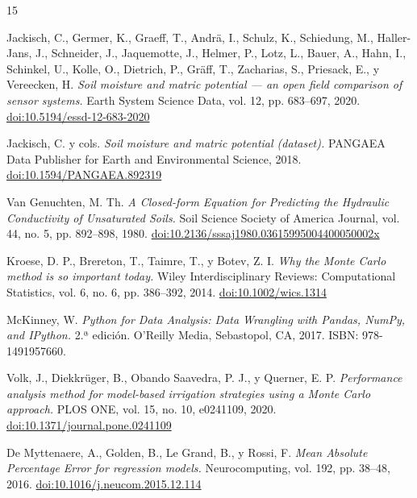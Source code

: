 \documentclass[12pt,a4paper]{article}
\begin{document}
\begin{thebibliography}{15}
\raggedright

Jackisch, C., Germer, K., Graeff, T., Andrä, I., Schulz, K., Schiedung, M., Haller-Jans, J., Schneider, J., Jaquemotte, J., Helmer, P., Lotz, L., Bauer, A., Hahn, I., Schinkel, U., Kolle, O., Dietrich, P., Gräff, T., Zacharias, S., Priesack, E., y Vereecken, H.
\textit{Soil moisture and matric potential --- an open field comparison of sensor systems.}
Earth System Science Data, vol. 12, pp. 683--697, 2020.
\href{https://doi.org/10.5194/essd-12-683-2020}{doi:10.5194/essd-12-683-2020}

Jackisch, C. y cols.
\textit{Soil moisture and matric potential (dataset).}
PANGAEA Data Publisher for Earth and Environmental Science, 2018.
\href{https://doi.org/10.1594/PANGAEA.892319}{doi:10.1594/PANGAEA.892319}

Van Genuchten, M. Th.
\textit{A Closed-form Equation for Predicting the Hydraulic Conductivity of Unsaturated Soils.}
Soil Science Society of America Journal, vol. 44, no. 5, pp. 892--898, 1980.
\href{https://doi.org/10.2136/sssaj1980.03615995004400050002x}{doi:10.2136/sssaj1980.03615995004400050002x}

Kroese, D. P., Brereton, T., Taimre, T., y Botev, Z. I.
\textit{Why the Monte Carlo method is so important today.}
Wiley Interdisciplinary Reviews: Computational Statistics, vol. 6, no. 6, pp. 386--392, 2014.
\href{https://doi.org/10.1002/wics.1314}{doi:10.1002/wics.1314}

McKinney, W.
\textit{Python for Data Analysis: Data Wrangling with Pandas, NumPy, and IPython.}
2.ª edición. O'Reilly Media, Sebastopol, CA, 2017. ISBN: 978-1491957660.

Volk, J., Diekkrüger, B., Obando Saavedra, P. J., y Querner, E. P.
\textit{Performance analysis method for model-based irrigation strategies using a Monte Carlo approach.}
PLOS ONE, vol. 15, no. 10, e0241109, 2020.
\href{https://doi.org/10.1371/journal.pone.0241109}{doi:10.1371/journal.pone.0241109}

De Myttenaere, A., Golden, B., Le Grand, B., y Rossi, F.
\textit{Mean Absolute Percentage Error for regression models.}
Neurocomputing, vol. 192, pp. 38--48, 2016.
\href{https://doi.org/10.1016/j.neucom.2015.12.114}{doi:10.1016/j.neucom.2015.12.114}


\end{thebibliography}
\end{document}

